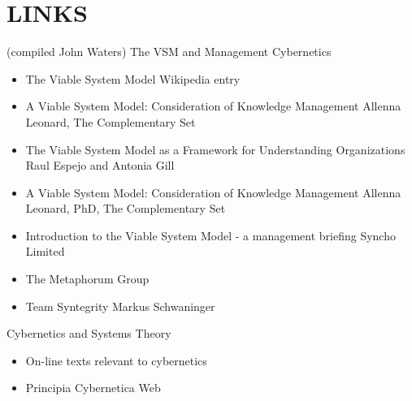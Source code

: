 \chapter*{LINKS}		\label{LINKS}
(compiled John Waters)
The VSM and Management Cybernetics
\begin{itemize}
	\item The Viable System Model
	Wikipedia entry
	\item A Viable System Model: Consideration of Knowledge Management
	Allenna Leonard, The Complementary Set
	\item The Viable System Model as a Framework for Understanding Organizations
	Raul Espejo and Antonia Gill
	\item A Viable System Model: Consideration of Knowledge Management
	Allenna Leonard, PhD, The Complementary Set
	\item Introduction to the Viable System Model - a management briefing
	Syncho Limited
	\item The Metaphorum Group
	\item Team Syntegrity
	Markus Schwaninger
\end{itemize}

Cybernetics and Systems Theory
\begin{itemize}
	\item On-line texts relevant to cybernetics
	\item Principia Cybernetica Web
\end{itemize}
